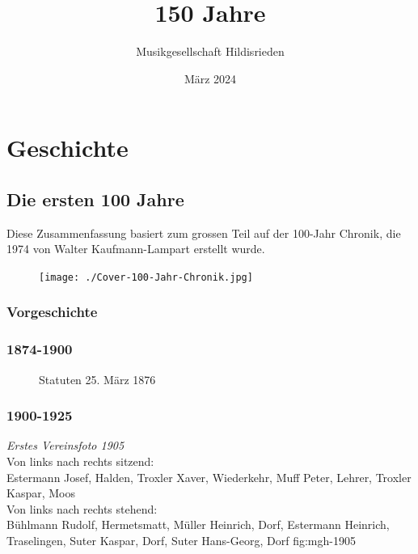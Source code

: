\documentclass[]{book}
\title{150 Jahre}
\author{Musikgesellschaft Hildisrieden}
\date{März 2024}
\begin{document}
\frontmatter
\maketitle

\tableofcontents

\mainmatter

\part{Geschichte}
\chapter{Die ersten 100 Jahre}

Diese Zusammenfassung basiert zum grossen Teil auf der 100-Jahr Chronik, die 1974 von Walter Kaufmann-Lampart erstellt wurde.
\begin{figure}[ht]
    \texttt{[image: ./Cover-100-Jahr-Chronik.jpg]}
\end{figure}
\section{Vorgeschichte}



\section{1874-1900}

\begin{figure}[ht]
    \centering
    \hfil
    \caption{Statuten 25. März 1876}
    \label{fig:Statuten-1874}
\end{figure}


\clearpage

\section{1900-1925}

{\emph{Erstes Vereinsfoto 1905}\\
    Von links nach rechts sitzend:\\
    Estermann Josef, Halden, Troxler Xaver, Wiederkehr, Muff Peter, Lehrer,
    Troxler Kaspar, Moos\\
    Von links nach rechts stehend:\\
    Bühlmann Rudolf, Hermetsmatt, Müller Heinrich, Dorf, Estermann Heinrich,
    Traselingen, Suter Kaspar, Dorf, Suter Hans-Georg, Dorf} {fig:mgh-1905}
\end{document}
